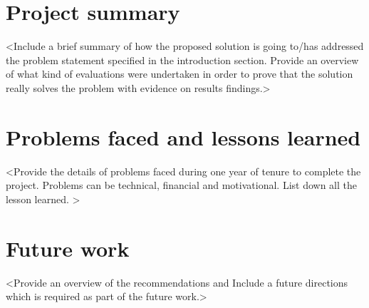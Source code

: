 \section{Project summary}
<Include a brief summary of how the proposed solution is going to/has addressed the problem statement specified in the introduction section. Provide an overview of what kind of evaluations were undertaken in order to prove that the solution really solves the problem with evidence on results findings.>

\section{Problems faced and lessons learned}
<Provide the details of problems faced during one year of tenure to complete the project. Problems can be technical, financial and motivational. List down all the lesson learned. >

\section{Future work}
<Provide an overview of the recommendations and Include a future directions which is required as part of the future work.>